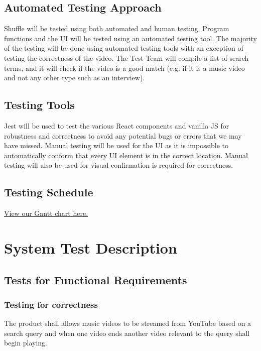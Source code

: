 \documentclass[12pt, titlepage]{article}
\begin{document}
\subsection{Automated Testing Approach}
Shuffle will be tested using both automated and human testing. Program functions and the UI will be tested using an automated testing tool. The majority of the testing will be done using automated testing tools with an exception of testing the correctness of the video. The Test Team will compile a list of search terms, and it will check if the video is a good match (e.g. if it is a music video and not any other type such as an interview).

\subsection{Testing Tools}
Jest will be used to test the various React components and vanilla JS \color{red}for robustness and correctness to avoid any potential bugs or errors that we may have missed\color{black}. Manual testing will be used for the UI \color{red} as it is impossible to automatically conform that every UI element is in the correct location. Manual testing will also be used for visual confirmation\color{black} is required for correctness.

\subsection{Testing Schedule}
		
\href{https://gitlab.cas.mcmaster.ca/delalik/Shuffle/blob/master/ProjectSchedule/Shuffle.gan}{View our Gantt chart here.}

\section{System Test Description}
	
\subsection{Tests for Functional Requirements}

\subsubsection{Testing for correctness}

The product shall allows music videos to be streamed from YouTube based on a search query and when one video ends another video relevant to the query shall begin playing.
		
\end{document}
